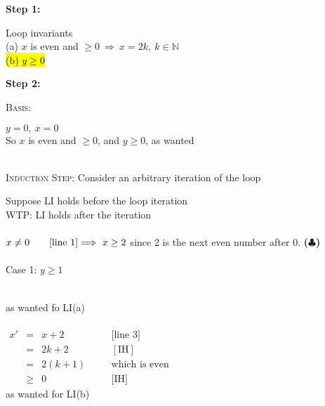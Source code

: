 \documentclass[12pt]{article}
\newcommand{\N}{\mathbb{N}}
\newcommand\myalign[1]{\alignShortstack{\strut#1\strut}}
\begin{document}
\noindent \textbf{Step 1:}

\hfill\begin{minipage}{\dimexpr\textwidth-10mm}
	Loop invariants\\
	\hspace*{10 pt} (a) $x$ is even and $\geq 0$$\ \Longrightarrow \ x = 2k, \ k\in \N$\\
	\hspace*{10 pt} \hl{(b) $y \geq 0$}\\
\end{minipage}
\textbf{Step 2:} %

\hfill\begin{minipage}{\dimexpr\textwidth-10mm}
	\textsc{Basis:}

	\hfill\begin{minipage}{\dimexpr\textwidth-10mm}
		$y = 0, \ x = 0$\\
		So $x$ is even and $\geq 0$, and $y \geq 0$, as wanted
	\end{minipage}\\

	\textsc{Induction Step:} Consider an arbitrary iteration of the loop

	\hfill\begin{minipage}{\dimexpr\textwidth-10mm}
		Suppose LI holds before the loop iteration \qquad [IH]\\
		WTP: LI holds after the iteration
		\\\\
		$x \not = 0 \qquad \text{[line 1]}\\
			\Longrightarrow \ x \geq 2$ since 2 is the next even number after 0. \qquad \textbf{($\clubsuit $)}
		\\\\
		Case 1: $y \geq 1$

		\hfill\begin{minipage}{\dimexpr\textwidth-10mm}
			\myalign{
				y'\ &=\ y - 1\qquad \text{[line 3]}\\
				&\geq\ 1 - 1\qquad [\text{line 2}]\\
				&=\ 0
			}\\
			as wanted fo LI(a)
			\\\\
			$\begin{array}{lcll}
					x' & =    & x+2 \qquad \qquad & \text{[line 3]}      \\
					   & =    & 2k + 2            & [\text{IH}]          \\
					   & =    & 2(k+1)            & \text{which is even} \\
					   & \geq & 0                 & \text{[IH]}
				\end{array}$\\
			as wanted for LI(b)\\


\end{minipage}
\end{minipage}
\end{minipage}
\end{document}
